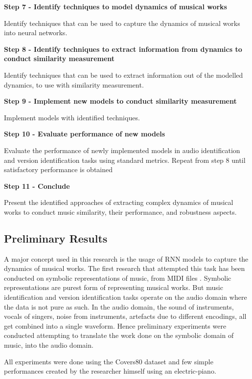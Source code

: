 \documentclass[../main.tex]{subfiles}
\begin{document}
\textbf{Step 7 - Identify techniques to model dynamics of musical works}
\par
Identify techniques that can be used to capture the dynamics of musical works into neural networks.

\textbf{Step 8 - Identify techniques to extract information from dynamics to conduct similarity measurement}
\par
Identify techniques that can be used to extract information out of the modelled dynamics, to use with similarity measurement.

\textbf{Step 9 - Implement new models to conduct similarity measurement}
\par
Implement models with identified techniques.


\textbf{Step 10 - Evaluate performance of new models}
\par
Evaluate the performance of newly implemented models in audio identification and version identification tasks using standard metrics. Repeat from step 8 until satisfactory performance is obtained


\textbf{Step 11 - Conclude}
\par
Present the identified approaches of extracting complex dynamics of musical works to conduct music similarity, their performance, and robustness aspects.

\newpage
\subsection{Preliminary Results}

\par
A major concept used in this research is the usage of \gls{RNN} models to capture the dynamics of musical works. The first research that attempted this task has been conducted on symbolic representations of music, from \gls{MIDI} files \cite{tian_cheng_comparing_2018}. Symbolic representations are purest form of representing musical works. But music identification and version identification tasks operate on the audio domain where the data is not pure as such. In the audio domain, the sound of instruments, vocals of singers, noise from instruments, artefacts due to different encodings, all get combined into a single waveform. Hence preliminary experiments were conducted attempting to translate the work done on the symbolic domain of music, into the audio domain.

\par
All experiments were done using the Covers80\cite{Covers80CoverSong} dataset and few simple performances created by the researcher himself using an electric-piano.
\end{document}
